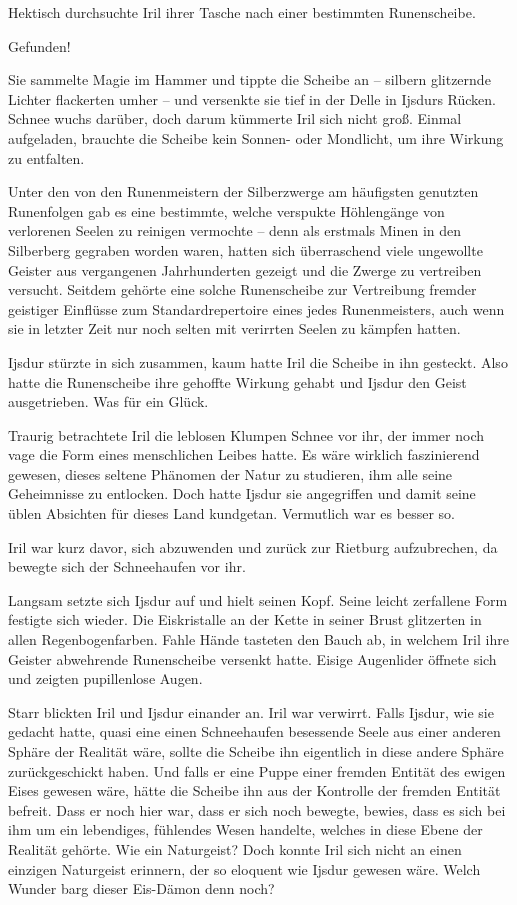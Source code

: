 Hektisch durchsuchte Iril ihrer Tasche nach einer bestimmten Runenscheibe.

Gefunden!

Sie sammelte Magie im Hammer und tippte die Scheibe an – silbern glitzernde Lichter flackerten umher – und versenkte sie tief in der Delle in Ijsdurs Rücken. Schnee wuchs darüber, doch darum kümmerte Iril sich nicht groß. Einmal aufgeladen, brauchte die Scheibe kein Sonnen- oder Mondlicht, um ihre Wirkung zu entfalten.

Unter den von den Runenmeistern der Silberzwerge am häufigsten genutzten Runenfolgen gab es eine bestimmte, welche verspukte Höhlengänge von verlorenen Seelen zu reinigen vermochte – denn als erstmals Minen in den Silberberg gegraben worden waren, hatten sich überraschend viele ungewollte Geister aus vergangenen Jahrhunderten gezeigt und die Zwerge zu vertreiben versucht. Seitdem gehörte eine solche Runenscheibe zur Vertreibung fremder geistiger Einflüsse zum Standardrepertoire eines jedes Runenmeisters, auch wenn sie in letzter Zeit nur noch selten mit verirrten Seelen zu kämpfen hatten.

Ijsdur stürzte in sich zusammen, kaum hatte Iril die Scheibe in ihn gesteckt. Also hatte die Runenscheibe ihre gehoffte Wirkung gehabt und Ijsdur den Geist ausgetrieben. Was für ein Glück.

Traurig betrachtete Iril die leblosen Klumpen Schnee vor ihr, der immer noch vage die Form eines menschlichen Leibes hatte. Es wäre wirklich faszinierend gewesen, dieses seltene Phänomen der Natur zu studieren, ihm alle seine Geheimnisse zu entlocken. Doch hatte Ijsdur sie angegriffen und damit seine üblen Absichten für dieses Land kundgetan. Vermutlich war es besser so.

Iril war kurz davor, sich abzuwenden und zurück zur Rietburg aufzubrechen, da bewegte sich der Schneehaufen vor ihr.

Langsam setzte sich Ijsdur auf und hielt seinen Kopf. Seine leicht zerfallene Form festigte sich wieder. Die Eiskristalle an der Kette in seiner Brust glitzerten in allen Regenbogenfarben. Fahle Hände tasteten den Bauch ab, in welchem Iril ihre Geister abwehrende Runenscheibe versenkt hatte. Eisige Augenlider öffnete sich und zeigten pupillenlose Augen.

Starr blickten Iril und Ijsdur einander an. Iril war verwirrt. Falls Ijsdur, wie sie gedacht hatte, quasi eine einen Schneehaufen besessende Seele aus einer anderen Sphäre der Realität wäre, sollte die Scheibe ihn eigentlich in diese andere Sphäre zurückgeschickt haben. Und falls er eine Puppe einer fremden Entität des ewigen Eises gewesen wäre, hätte die Scheibe ihn aus der Kontrolle der fremden Entität befreit. Dass er noch hier war, dass er sich noch bewegte, bewies, dass es sich bei ihm um ein lebendiges, fühlendes Wesen handelte, welches in diese Ebene der Realität gehörte. Wie ein Naturgeist? Doch konnte Iril sich nicht an einen einzigen Naturgeist erinnern, der so eloquent wie Ijsdur gewesen wäre. Welch Wunder barg dieser Eis-Dämon denn noch?

